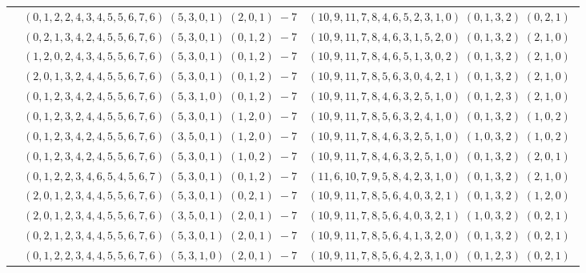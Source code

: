 \documentclass[11pt]{article}
\begin{document}
\begin{longtable}[l]{|c|c|c|}
 \cline{2-3} 
 & $(0 ,1 ,2 ,2 ,4 ,3 ,4 ,5 ,5 ,6 ,7 ,6) \;(5 ,3 ,0 ,1) \;(2 ,0 ,1) \;-7$ & $(10 ,9 ,11 ,7 ,8 ,4 ,6 ,5 ,2 ,3 ,1 ,0) \;(0 ,1 ,3 ,2) \;(0 ,2 ,1) \;$\\ 
 \cline{2-3} 
 & $(0 ,2 ,1 ,3 ,4 ,2 ,4 ,5 ,5 ,6 ,7 ,6) \;(5 ,3 ,0 ,1) \;(0 ,1 ,2) \;-7$ & $(10 ,9 ,11 ,7 ,8 ,4 ,6 ,3 ,1 ,5 ,2 ,0) \;(0 ,1 ,3 ,2) \;(2 ,1 ,0) \;$\\ 
 \cline{2-3} 
 & $(1 ,2 ,0 ,2 ,4 ,3 ,4 ,5 ,5 ,6 ,7 ,6) \;(5 ,3 ,0 ,1) \;(0 ,1 ,2) \;-7$ & $(10 ,9 ,11 ,7 ,8 ,4 ,6 ,5 ,1 ,3 ,0 ,2) \;(0 ,1 ,3 ,2) \;(2 ,1 ,0) \;$\\ 
 \cline{2-3} 
 & $(2 ,0 ,1 ,3 ,2 ,4 ,4 ,5 ,5 ,6 ,7 ,6) \;(5 ,3 ,0 ,1) \;(0 ,1 ,2) \;-7$ & $(10 ,9 ,11 ,7 ,8 ,5 ,6 ,3 ,0 ,4 ,2 ,1) \;(0 ,1 ,3 ,2) \;(2 ,1 ,0) \;$\\ 
 \cline{2-3} 
 & $(0 ,1 ,2 ,3 ,4 ,2 ,4 ,5 ,5 ,6 ,7 ,6) \;(5 ,3 ,1 ,0) \;(0 ,1 ,2) \;-7$ & $(10 ,9 ,11 ,7 ,8 ,4 ,6 ,3 ,2 ,5 ,1 ,0) \;(0 ,1 ,2 ,3) \;(2 ,1 ,0) \;$\\ 
 \cline{2-3} 
 & $(0 ,1 ,2 ,3 ,2 ,4 ,4 ,5 ,5 ,6 ,7 ,6) \;(5 ,3 ,0 ,1) \;(1 ,2 ,0) \;-7$ & $(10 ,9 ,11 ,7 ,8 ,5 ,6 ,3 ,2 ,4 ,1 ,0) \;(0 ,1 ,3 ,2) \;(1 ,0 ,2) \;$\\ 
 \cline{2-3} 
 & $(0 ,1 ,2 ,3 ,4 ,2 ,4 ,5 ,5 ,6 ,7 ,6) \;(3 ,5 ,0 ,1) \;(1 ,2 ,0) \;-7$ & $(10 ,9 ,11 ,7 ,8 ,4 ,6 ,3 ,2 ,5 ,1 ,0) \;(1 ,0 ,3 ,2) \;(1 ,0 ,2) \;$\\ 
 \cline{2-3} 
 & $(0 ,1 ,2 ,3 ,4 ,2 ,4 ,5 ,5 ,6 ,7 ,6) \;(5 ,3 ,0 ,1) \;(1 ,0 ,2) \;-7$ & $(10 ,9 ,11 ,7 ,8 ,4 ,6 ,3 ,2 ,5 ,1 ,0) \;(0 ,1 ,3 ,2) \;(2 ,0 ,1) \;$\\ 
 \cline{2-3} 
 & $(0 ,1 ,2 ,2 ,3 ,4 ,6 ,5 ,4 ,5 ,6 ,7) \;(5 ,3 ,0 ,1) \;(0 ,1 ,2) \;-7$ & $(11 ,6 ,10 ,7 ,9 ,5 ,8 ,4 ,2 ,3 ,1 ,0) \;(0 ,1 ,3 ,2) \;(2 ,1 ,0) \;$\\ 
 \cline{2-3} 
 & $(2 ,0 ,1 ,2 ,3 ,4 ,4 ,5 ,5 ,6 ,7 ,6) \;(5 ,3 ,0 ,1) \;(0 ,2 ,1) \;-7$ & $(10 ,9 ,11 ,7 ,8 ,5 ,6 ,4 ,0 ,3 ,2 ,1) \;(0 ,1 ,3 ,2) \;(1 ,2 ,0) \;$\\ 
 \cline{2-3} 
 & $(2 ,0 ,1 ,2 ,3 ,4 ,4 ,5 ,5 ,6 ,7 ,6) \;(3 ,5 ,0 ,1) \;(2 ,0 ,1) \;-7$ & $(10 ,9 ,11 ,7 ,8 ,5 ,6 ,4 ,0 ,3 ,2 ,1) \;(1 ,0 ,3 ,2) \;(0 ,2 ,1) \;$\\ 
 \cline{2-3} 
 & $(0 ,2 ,1 ,2 ,3 ,4 ,4 ,5 ,5 ,6 ,7 ,6) \;(5 ,3 ,0 ,1) \;(2 ,0 ,1) \;-7$ & $(10 ,9 ,11 ,7 ,8 ,5 ,6 ,4 ,1 ,3 ,2 ,0) \;(0 ,1 ,3 ,2) \;(0 ,2 ,1) \;$\\ 
 \cline{2-3} 
 & $(0 ,1 ,2 ,2 ,3 ,4 ,4 ,5 ,5 ,6 ,7 ,6) \;(5 ,3 ,1 ,0) \;(2 ,0 ,1) \;-7$ & $(10 ,9 ,11 ,7 ,8 ,5 ,6 ,4 ,2 ,3 ,1 ,0) \;(0 ,1 ,2 ,3) \;(0 ,2 ,1) \;$\\ 

\end{longtable}
\end{document}
